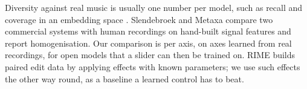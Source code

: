 Diversity against real music is usually one number per model, such as recall and coverage in an embedding space \citep{novack2024presto}. Slendebroek and Metaxa \citep{slendebroek2026flattening} compare two commercial systems with human recordings on hand-built signal features and report homogenisation. Our comparison is per axis, on axes learned from real recordings, for open models that a slider can then be trained on. RIME \citep{schaffer2026rime} builds paired edit data by applying effects with known parameters; we use such effects the other way round, as a baseline a learned control has to beat.
